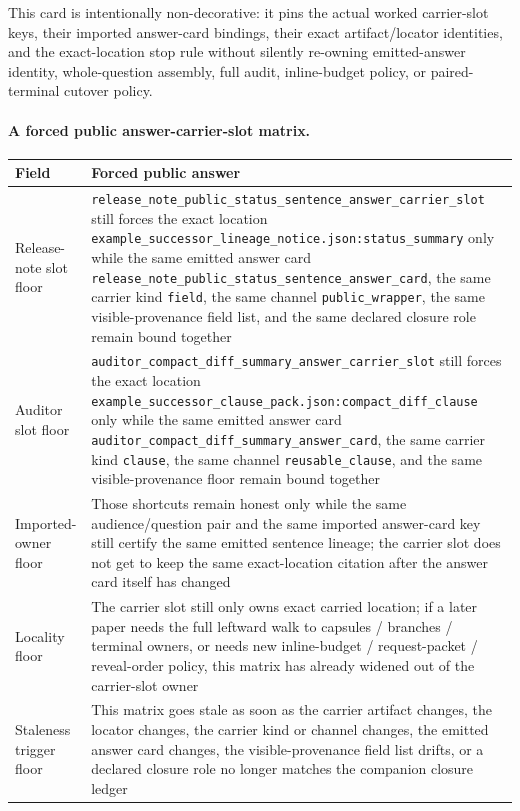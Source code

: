 \documentclass[11pt]{article}
\begin{document}
This card is intentionally non-decorative: it pins the actual worked carrier-slot keys, their imported answer-card bindings, their exact artifact/locator identities, and the exact-location stop rule without silently re-owning emitted-answer identity, whole-question assembly, full audit, inline-budget policy, or paired-terminal cutover policy.\cite{series:workedexample}

\paragraph{A forced public answer-carrier-slot matrix.}
\begin{table}[t]
\centering
\small
\begin{tabularx}{\linewidth}{@{}lX@{}}
\toprule
Field & Forced public answer \\
\midrule
Release-note slot floor & \nolinkurl{release_note_public_status_sentence_answer_carrier_slot} still forces the exact location \nolinkurl{example_successor_lineage_notice.json:status_summary} only while the same emitted answer card \nolinkurl{release_note_public_status_sentence_answer_card}, the same carrier kind \texttt{field}, the same channel \texttt{public_wrapper}, the same visible-provenance field list, and the same declared closure role remain bound together \\
Auditor slot floor & \nolinkurl{auditor_compact_diff_summary_answer_carrier_slot} still forces the exact location \nolinkurl{example_successor_clause_pack.json:compact_diff_clause} only while the same emitted answer card \nolinkurl{auditor_compact_diff_summary_answer_card}, the same carrier kind \texttt{clause}, the same channel \texttt{reusable_clause}, and the same visible-provenance floor remain bound together \\
Imported-owner floor & Those shortcuts remain honest only while the same audience/question pair and the same imported answer-card key still certify the same emitted sentence lineage; the carrier slot does not get to keep the same exact-location citation after the answer card itself has changed \\
Locality floor & The carrier slot still only owns exact carried location; if a later paper needs the full leftward walk to capsules / branches / terminal owners, or needs new inline-budget / request-packet / reveal-order policy, this matrix has already widened out of the carrier-slot owner \\
Staleness trigger floor & This matrix goes stale as soon as the carrier artifact changes, the locator changes, the carrier kind or channel changes, the emitted answer card changes, the visible-provenance field list drifts, or a declared closure role no longer matches the companion closure ledger \\

\end{tabularx}
\end{table}
\end{document}
